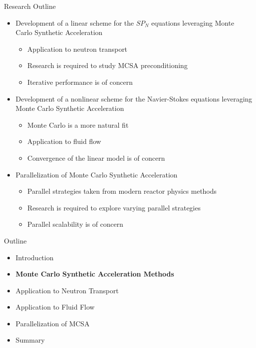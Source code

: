 \documentclass{beamer}
\begin{document}
\begin{frame}{Research Outline}
  \begin{itemize}
  \item Development of a linear scheme for the $SP_N$ equations
    leveraging Monte Carlo Synthetic Acceleration
    \medskip
    \begin{itemize}
    \item Application to neutron transport
    \item Research is required to study MCSA preconditioning
    \item Iterative performance is of concern
    \end{itemize}
    \bigskip
  \item Development of a nonlinear scheme for the Navier-Stokes
    equations leveraging Monte Carlo Synthetic Acceleration
    \medskip
    \begin{itemize}
    \item Monte Carlo is a more natural fit
    \item Application to fluid flow
    \item Convergence of the linear model is of concern
    \end{itemize}
    \bigskip
  \item Parallelization of Monte Carlo Synthetic Acceleration
    \medskip
    \begin{itemize}
    \item Parallel strategies taken from modern reactor physics
      methods
    \item Research is required to explore varying parallel strategies
    \item Parallel scalability is of concern
    \end{itemize}
  \end{itemize}
\end{frame}

\begin{frame}{Outline}

  \begin{itemize}
  \item Introduction
    \bigskip
  \item \textbf{Monte Carlo Synthetic Acceleration Methods}
    \bigskip
  \item Application to Neutron Transport
    \bigskip
  \item Application to Fluid Flow
    \bigskip
  \item Parallelization of MCSA
    \bigskip
  \item Summary
  \end{itemize}

\end{frame}
\end{document}
